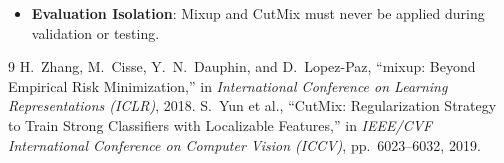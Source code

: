 \documentclass[11pt,a4paper]{article}
\theoremstyle{definition}
\begin{document}
\begin{itemize}
    \item \textbf{Evaluation Isolation}: Mixup and CutMix must never be applied during validation or testing.
\end{itemize}

\begin{thebibliography}{9}
 H.~Zhang, M.~Cisse, Y.~N.~Dauphin, and D.~Lopez-Paz, ``mixup: Beyond Empirical Risk Minimization,'' in \emph{International Conference on Learning Representations (ICLR)}, 2018.
 S.~Yun et al., ``CutMix: Regularization Strategy to Train Strong Classifiers with Localizable Features,'' in \emph{IEEE/CVF International Conference on Computer Vision (ICCV)}, pp.~6023--6032, 2019.
\end{thebibliography}
\end{document}
